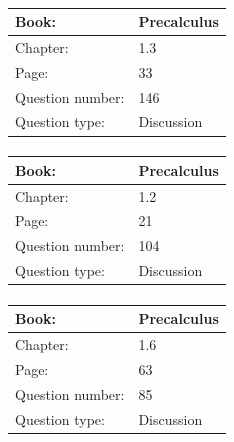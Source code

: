 \documentclass{article}
\begin{document}
            \paragraph{}
            \begin{tabularx}{1\textwidth}{
                    p{}
                    p{}
                }
                \toprule
                Book: & Precalculus
                \\
                \midrule
                Chapter: & 1.3
                \\
                \midrule
                Page: & 33
                \\
                \midrule
                Question number: & 146
                \\
                \midrule
                Question type: & Discussion
                \\
                \bottomrule
            \end{tabularx}
            
            \paragraph{}
            \begin{tabularx}{1\textwidth}{
                    p{}
                    p{}
                }
                \toprule
                Book: & Precalculus
                \\
                \midrule
                Chapter: & 1.2
                \\
                \midrule
                Page: & 21
                \\
                \midrule
                Question number: & 104
                \\
                \midrule
                Question type: & Discussion
                \\
                \bottomrule
            \end{tabularx}
            
            \paragraph{}
            \begin{tabularx}{1\textwidth}{
                    p{}
                    p{}
                }
                \toprule
                Book: & Precalculus
                \\
                \midrule
                Chapter: & 1.6
                \\
                \midrule
                Page: & 63
                \\
                \midrule
                Question number: & 85
                \\
                \midrule
                Question type: & Discussion
                \\
                \bottomrule
            \end{tabularx}
            
\end{document}

